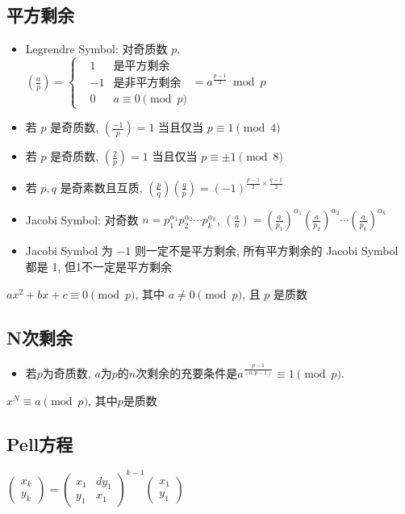\documentclass[landscape, twocolumn, 8pt, a4paper, twoside]{extarticle}
\begin{document}
\subsection{平方剩余}
\begin{itemize}
\item Legrendre Symbol: 对奇质数 $p$, $(\frac{a}{p}) =
  \left\{
    \begin{aligned}
      &  1 & \textrm{是平方剩余} \\
      & -1 & \textrm{是非平方剩余} \\
      &  0 & \textrm{$a \equiv 0 \pmod{p}$}
    \end{aligned}
  \right.
  = a^{\frac{p - 1}{2}} \bmod{p} $
\item 若 $p$ 是奇质数, $(\frac{-1}{p}) = 1$ 当且仅当 $p \equiv 1 \pmod{4}$
\item 若 $p$ 是奇质数, $(\frac{ 2}{p}) = 1$ 当且仅当 $p \equiv \pm 1 \pmod{8}$
\item 若 $p, q$ 是奇素数且互质, $(\frac{p}{q})(\frac{q}{p}) = (-1)^{\frac{p - 1}{2} \times \frac{q - 1}{2}}$
\item Jacobi Symbol: 对奇数 $n = p_1^{\alpha_1} p_2^{\alpha_2} \cdots p_k ^ {\alpha_k} $, 
  $(\frac{a}{n}) = (\frac{a}{p_1})^{\alpha_1} (\frac{a}{p_2})^{\alpha_2} \cdots (\frac{a}{p_k})^{\alpha_k}$
\item Jacobi Symbol 为 $-1$ 则一定不是平方剩余, 所有平方剩余的 Jacobi Symbol 都是 1, 但1不一定是平方剩余
\end{itemize}

$ax^2 + bx + c \equiv 0 \pmod{p}$, 其中 $a \ne 0 \pmod{p}$, 且 $p$ 是质数


\subsection{N次剩余}
\begin{itemize}
\item 若$p$为奇质数, $a$为$p$的$n$次剩余的充要条件是$a^{\frac{p - 1}{(a, p - 1)}} \equiv 1 \pmod{p}$.
\end{itemize}
$x^N \equiv a \pmod{p}$, 其中$p$是质数


\subsection{Pell方程}
$\begin{pmatrix}
  x_k \\ y_k
\end{pmatrix} = 
\begin{pmatrix}
  x_1 & dy_1 \\
  y_1 & x_1
\end{pmatrix} ^ {k - 1}
\begin{pmatrix}
  x_1 \\ y_1
\end{pmatrix}
$
\end{document}
